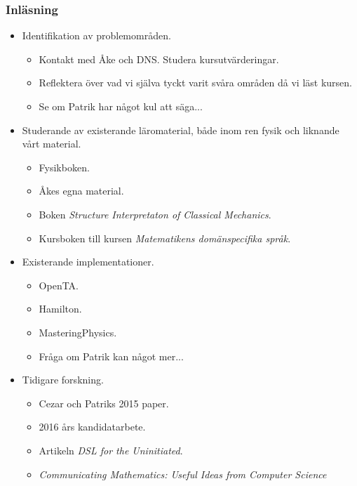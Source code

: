 \documentclass[12pt,a4paper]{article}
\begin{document}
\subsubsection*{Inläsning}

\begin{itemize}
    \item Identifikation av problemområden.
        \begin{itemize}
            \item Kontakt med Åke och DNS. Studera kursutvärderingar.
            \item Reflektera över vad vi själva tyckt varit svåra områden då vi läst kursen.
            \item Se om Patrik har något kul att säga...
        \end{itemize}
    \item Studerande av existerande läromaterial, både inom ren fysik och liknande vårt material.
        \begin{itemize}
            \item Fysikboken.
            \item Åkes egna material.
            \item Boken \textit{Structure Interpretaton of Classical Mechanics}\cite{SICM}.
            \item Kursboken till kursen \textit{Matematikens domänspecifika språk}.
        \end{itemize}
    \item Existerande implementationer.
        \begin{itemize}
            \item OpenTA.
            \item Hamilton.
            \item MasteringPhysics.
            \item Fråga om Patrik kan något mer...
        \end{itemize}
    \item Tidigare forskning.
        \begin{itemize}
            \item Cezar och Patriks 2015 paper.
            \item 2016 års kandidatarbete.
            \item Artikeln \textit{DSL for the Uninitiated}.
            \item \textit{Communicating Mathematics: Useful Ideas from Computer Science}
        \end{itemize}
\end{itemize}
\end{document}
